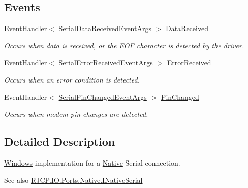 \subsection*{Events}
\begin{DoxyCompactItemize}
\item 
Event\+Handler$<$ \mbox{\hyperlink{class_r_j_c_p_1_1_i_o_1_1_ports_1_1_serial_data_received_event_args}{Serial\+Data\+Received\+Event\+Args}} $>$ \mbox{\hyperlink{class_r_j_c_p_1_1_i_o_1_1_ports_1_1_native_1_1_win_native_serial_a70c1e2700aceb87a61f626af238f4ce8}{Data\+Received}}
\begin{DoxyCompactList}\small\item\em Occurs when data is received, or the E\+OF character is detected by the driver. \end{DoxyCompactList}\item 
Event\+Handler$<$ \mbox{\hyperlink{class_r_j_c_p_1_1_i_o_1_1_ports_1_1_serial_error_received_event_args}{Serial\+Error\+Received\+Event\+Args}} $>$ \mbox{\hyperlink{class_r_j_c_p_1_1_i_o_1_1_ports_1_1_native_1_1_win_native_serial_a38516663cb2df0644f512fae0d4bd65d}{Error\+Received}}
\begin{DoxyCompactList}\small\item\em Occurs when an error condition is detected. \end{DoxyCompactList}\item 
Event\+Handler$<$ \mbox{\hyperlink{class_r_j_c_p_1_1_i_o_1_1_ports_1_1_serial_pin_changed_event_args}{Serial\+Pin\+Changed\+Event\+Args}} $>$ \mbox{\hyperlink{class_r_j_c_p_1_1_i_o_1_1_ports_1_1_native_1_1_win_native_serial_a792fefde319c63e680f024a48023617a}{Pin\+Changed}}
\begin{DoxyCompactList}\small\item\em Occurs when modem pin changes are detected. \end{DoxyCompactList}\end{DoxyCompactItemize}


\subsection{Detailed Description}
\mbox{\hyperlink{namespace_r_j_c_p_1_1_i_o_1_1_ports_1_1_native_1_1_windows}{Windows}} implementation for a \mbox{\hyperlink{namespace_r_j_c_p_1_1_i_o_1_1_ports_1_1_native}{Native}} Serial connection. 

\begin{DoxySeeAlso}{See also}
\mbox{\hyperlink{interface_r_j_c_p_1_1_i_o_1_1_ports_1_1_native_1_1_i_native_serial}{R\+J\+C\+P.\+I\+O.\+Ports.\+Native.\+I\+Native\+Serial}}


\end{DoxySeeAlso}


